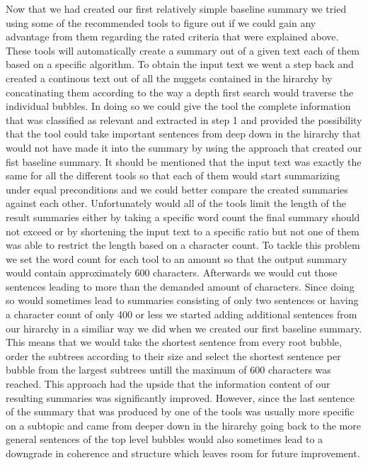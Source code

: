 Now that we had created our first relatively simple baseline summary we tried using some of the recommended tools to figure out if we could gain any advantage from them regarding the rated criteria that were explained above. These tools will automatically create a summary out of a given text each of them based on a specific algorithm. To obtain the input text we went a step back and created a continous text out of all the nuggets contained in the hirarchy by concatinating them according to the way a depth first search would traverse the individual bubbles. In doing so we could give the tool the complete information that was classified as relevant and extracted in step 1 and provided the possibility that the tool could take important sentences from deep down in the hirarchy that would not have made it into the summary by using the approach that created our fist baseline summary. It should be mentioned that the input text was exactly the same for all the different tools so that each of them would start summarizing under equal preconditions and we could better compare the created summaries against each other. Unfortunately would all of the tools limit the length of the result summaries either by taking a specific word count the final summary should not exceed or by shortening the input text to a specific ratio but not one of them was able to restrict the length based on a character count. To tackle this problem we set the word count for each tool to an amount so that the output summary would contain approximately 600 characters. Afterwards we would cut those sentences leading to more than the demanded amount of characters. Since doing so would sometimes lead to summaries consisting of only two sentences or having a character count of only 400 or less we started adding additional sentences from our hirarchy in a similiar way we did when we created our first baseline summary. This means that we would take the shortest sentence from every root bubble, order the subtrees according to their size and select the shortest sentence per bubble from the largest subtrees untill the maximum of 600 characters was reached. This approach had the upside that the information content of our resulting summaries was significantly improved. However, since the last sentence of the summary that was produced by one of the tools was usually more specific on a subtopic and came from deeper down in the hirarchy going back to the more general sentences of the top level bubbles would also sometimes lead to a downgrade in coherence and structure which leaves room for future improvement.  

